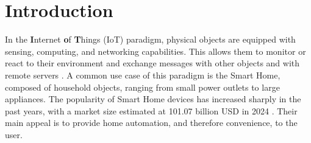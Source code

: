 \section{Introduction}\label{sec:intro}


In the \textbf{I}nternet \textbf{o}f \textbf{T}hings (IoT) paradigm, physical objects are equipped with sensing, computing, and networking capabilities. This allows them to monitor or react to their environment and exchange messages with other objects and with remote servers \cite{iot_survey}.
A common use case of this paradigm is the Smart Home, composed of household objects, ranging from small power outlets to large appliances. The popularity of Smart Home devices has increased sharply in the past years, with a market size estimated at 101.07 billion USD in 2024 \cite{smart-home-market-share-fortune}.
Their main appeal is to provide home automation, and therefore convenience, to the user.



